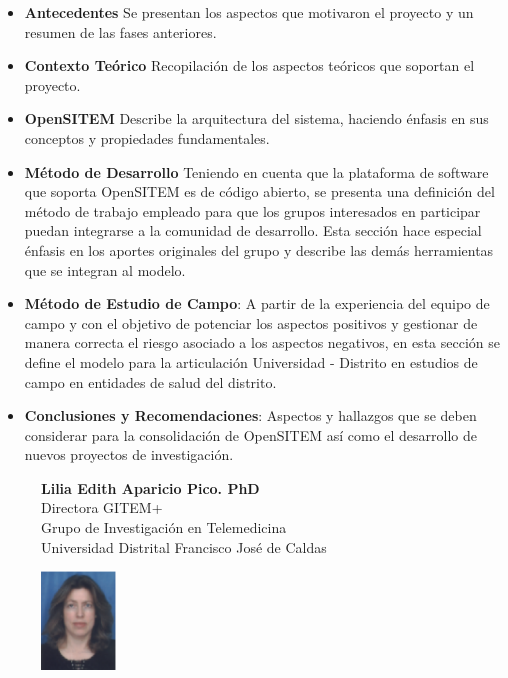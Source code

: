 \begin{itemize}
 \item \textbf{Antecedentes} Se presentan los aspectos que motivaron el proyecto y un resumen de las fases anteriores.
 \item \textbf{Contexto Teórico} Recopilación de los aspectos teóricos que soportan el proyecto. 
 \item \textbf{OpenSITEM} Describe la arquitectura del sistema, haciendo énfasis en sus conceptos y propiedades fundamentales.
 \item \textbf{Método de Desarrollo} Teniendo en cuenta que la plataforma de software que soporta OpenSITEM es de código abierto, se presenta una definición del método de trabajo empleado para que los grupos interesados en participar puedan integrarse a la comunidad de desarrollo. Esta sección hace especial énfasis en los aportes originales del grupo y describe las demás herramientas que se integran al modelo.
 \item \textbf{Método de Estudio de Campo}: A partir de la experiencia del equipo de campo y con el objetivo de potenciar los aspectos positivos y gestionar de manera correcta el riesgo asociado a los aspectos negativos, en esta sección se define el modelo para la articulación Universidad - Distrito en estudios de campo en entidades de salud del distrito.
 \item \textbf{Conclusiones y Recomendaciones}: Aspectos y hallazgos que se deben considerar para la consolidación de OpenSITEM así como el desarrollo de nuevos proyectos de investigación.
\end{itemize}

\begin{figure}[!htpb]
\begin{minipage}[r]{0.8\textwidth}
\begin{flushright}
\textbf{Lilia Edith Aparicio Pico. PhD}
\\Directora GITEM+\\Grupo de Investigación en Telemedicina\\Universidad Distrital Francisco José de Caldas
\end{flushright}
\end{minipage}
\begin{minipage}[r]{0.15\textwidth}
 \includegraphics[width=20mm, height=26mm]{edith.png}
\end{minipage}
\end{figure}
